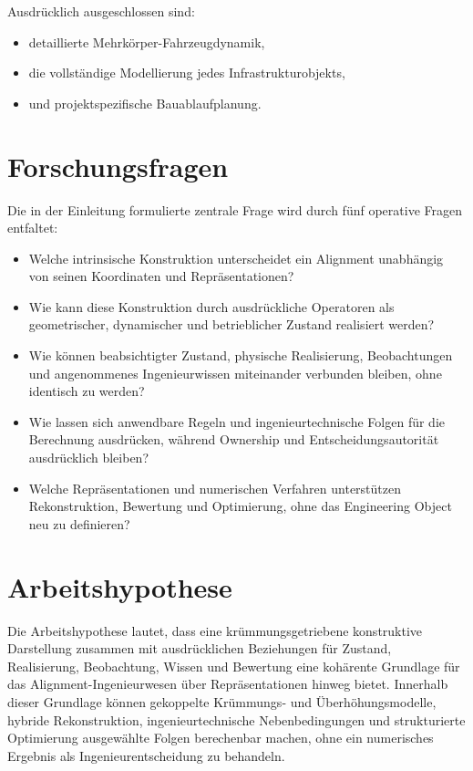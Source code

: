 Ausdrücklich ausgeschlossen sind:
\begin{itemize}
\item detaillierte Mehrkörper-Fahrzeugdynamik,
\item die vollständige Modellierung jedes Infrastrukturobjekts,
\item und projektspezifische Bauablaufplanung.
\end{itemize}

\section{Forschungsfragen}

Die in der Einleitung formulierte zentrale Frage wird durch fünf operative
Fragen entfaltet:
\begin{itemize}
\item Welche intrinsische Konstruktion unterscheidet ein Alignment unabhängig
  von seinen Koordinaten und Repräsentationen?
\item Wie kann diese Konstruktion durch ausdrückliche Operatoren als
  geometrischer, dynamischer und betrieblicher Zustand realisiert werden?
\item Wie können beabsichtigter Zustand, physische Realisierung,
  Beobachtungen und angenommenes Ingenieurwissen miteinander verbunden
  bleiben, ohne identisch zu werden?
\item Wie lassen sich anwendbare Regeln und ingenieurtechnische Folgen für die
  Berechnung ausdrücken, während Ownership und Entscheidungsautorität
  ausdrücklich bleiben?
\item Welche Repräsentationen und numerischen Verfahren unterstützen
  Rekonstruktion, Bewertung und Optimierung, ohne das Engineering Object neu
  zu definieren?
\end{itemize}

\section{Arbeitshypothese}

Die Arbeitshypothese lautet, dass eine krümmungsgetriebene konstruktive
Darstellung zusammen mit ausdrücklichen Beziehungen für Zustand,
Realisierung, Beobachtung, Wissen und Bewertung eine kohärente Grundlage für
das Alignment-Ingenieurwesen über Repräsentationen hinweg bietet. Innerhalb
dieser Grundlage können gekoppelte Krümmungs- und Überhöhungsmodelle, hybride
Rekonstruktion, ingenieurtechnische Nebenbedingungen und strukturierte
Optimierung ausgewählte Folgen berechenbar machen, ohne ein numerisches
Ergebnis als Ingenieurentscheidung zu behandeln.

